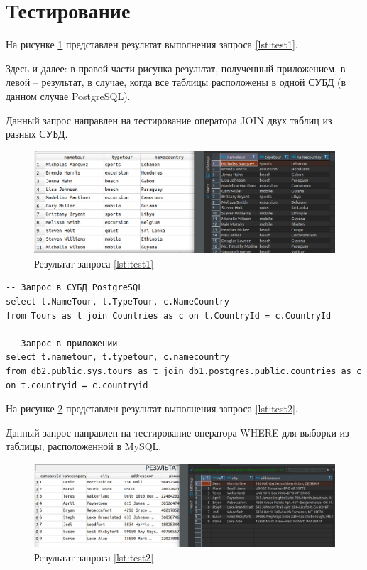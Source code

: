 \section{Тестирование}

На рисунке \ref{img:test1} представлен результат выполнения запроса \ref{lst:test1}. 

Здесь и далее: в правой части рисунка результат, полученный приложением, в левой -- результат, в случае, когда все таблицы расположены в одной СУБД (в данном случае PostgreSQL). 

Данный запрос направлен на тестирование оператора JOIN двух таблиц из разных СУБД.

\begin{figure}[h!]
	\begin{center}
		\includegraphics[scale=0.6]{./inc/img/test1}
		\caption{Результат запроса \ref{lst:test1}}
		\label{img:test1}
	\end{center}
\end{figure}


\begin{lstlisting}[label=lst:test1,caption=Запрос в PostgreSQL и приожения]
-- Запрос в СУБД PostgreSQL
select t.NameTour, t.TypeTour, c.NameCountry
from Tours as t join Countries as c on t.CountryId = c.CountryId

-- Запрос в приложении
select t.nametour, t.typetour, c.namecountry
from db2.public.sys.tours as t join db1.postgres.public.countries as c on t.countryid = c.countryid
\end{lstlisting}



На рисунке \ref{img:test2} представлен результат выполнения запроса \ref{lst:test2}. 

Данный запрос направлен на тестирование оператора WHERE для выборки из таблицы, расположенной в MySQL.
\clearpage
\begin{figure}[h!]
	\begin{center}
		\includegraphics[scale=0.5]{./inc/img/test2}
		\caption{Результат запроса \ref{lst:test2}}
		\label{img:test2}
	\end{center}
\end{figure}

